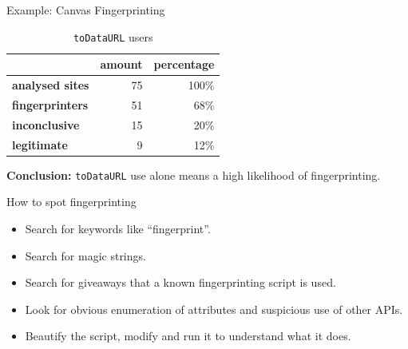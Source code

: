 \documentclass[t]{beamer}
\begin{document}
\begin{frame}{Example: Canvas Fingerprinting}
    \begin{table}
        \centering
        \caption{\texttt{toDataURL} users}
        \begin{tabular}{l r r}
            \toprule
            & amount & percentage \\
            \midrule
            \textbf{analysed sites} & 75 & 100\% \\
            \midrule
            \textbf{fingerprinters} & 51 & 68\% \\
            \textbf{inconclusive} & 15 & 20\% \\
            \textbf{legitimate} & 9 & 12\% \\
            \bottomrule
        \end{tabular}
    \end{table}

    \vspace{0.5cm}

    \pause
    \textbf{Conclusion:} \texttt{toDataURL} use alone means a high likelihood of fingerprinting.
\end{frame}

\begin{frame}{How to spot fingerprinting}
    \pause

    \begin{itemize}
        \item Search for keywords like ``fingerprint''.
        \pause
        \item Search for magic strings.
        \pause
        \item Search for giveaways that a known fingerprinting script is used.
        \pause
        \item Look for obvious enumeration of attributes and suspicious use of other APIs.
        \pause
        \item Beautify the script, modify and run it to understand what it does.
    \end{itemize}
\end{frame}
\end{document}
